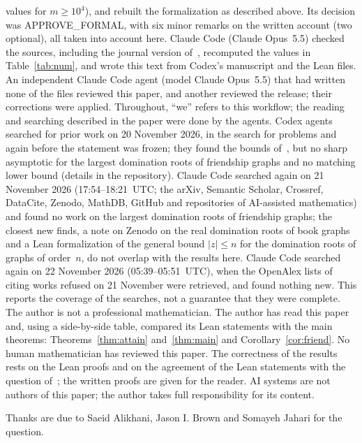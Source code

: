 \documentclass[11pt]{article}
\theoremstyle{definition}
\theoremstyle{remark}
\begin{document}
values for $m\ge10^4$), and rebuilt the formalization as described above. Its
decision was APPROVE\_FORMAL, with six minor remarks on the written account
(two optional), all taken into account here. Claude Code (Claude Opus~5.5)
checked the sources, including the journal version of~\cite{abj}, recomputed
the values in Table~\ref{tab:num}, and wrote this text from Codex's
manuscript and the Lean files. An independent Claude Code agent (model Claude Opus~5.5) that had written none of the files reviewed this paper, and another reviewed the release; their corrections were applied. Throughout, ``we'' refers to
this workflow; the reading and searching described in the paper were done by
the agents. Codex agents searched for prior work on 20 November 2026, in the
search for problems and again before the statement was frozen; they found
the bounds of~\cite{ra}, but no sharp asymptotic for the largest domination
roots of friendship graphs and no matching lower bound (details in the
repository). Claude Code searched again on 21 November 2026 (17:54--18:21~UTC; the arXiv, Semantic Scholar, Crossref, DataCite, Zenodo, MathDB, GitHub and repositories of AI-assisted mathematics) and found no work on the largest domination roots of friendship graphs; the closest new finds, a note on Zenodo on the real domination roots of book graphs and a Lean formalization of the general bound $|z|\le n$ for the domination roots of graphs of order~$n$, do not overlap with the results here. Claude Code searched again on 22 November 2026 (05:39--05:51~UTC), when the OpenAlex lists of citing works refused on 21 November were retrieved, and found nothing new. This reports the coverage of the searches,
not a guarantee that they were complete. The author is not a professional
mathematician. The author has read this paper and, using a side-by-side table, compared its Lean statements with the main theorems: Theorems~\ref{thm:attain} and~\ref{thm:main} and Corollary~\ref{cor:friend}. No human mathematician has reviewed this paper.
The correctness of the results rests on the Lean proofs and on the agreement
of the Lean statements with the question of~\cite{abj}; the written proofs
are given for the reader. AI systems are not authors of this paper; the
author takes full responsibility for its content.

\medskip
\noindent Thanks are due to Saeid Alikhani, Jason I. Brown and Somayeh Jahari
for the question.
\end{document}
